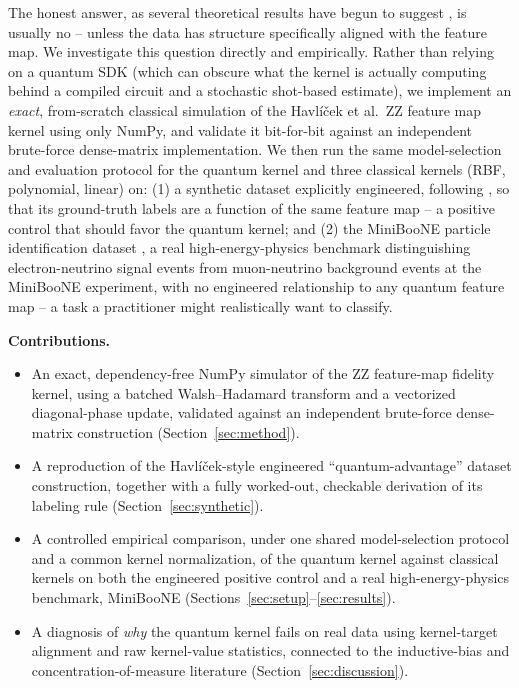 \documentclass{article}
\begin{document}
The honest answer, as several theoretical results have begun to suggest
\citep{kubler2021inductive, huang2021power, thanasilp2024exponential}, is
usually no -- unless the data has structure specifically aligned with the
feature map. We investigate this question directly and empirically. Rather
than relying on a quantum SDK (which can obscure what the kernel is actually
computing behind a compiled circuit and a stochastic shot-based estimate), we
implement an \emph{exact}, from-scratch classical simulation of the
Havl{\'i}\v{c}ek et al.\ ZZ feature map kernel using only NumPy, and validate
it bit-for-bit against an independent brute-force dense-matrix
implementation. We then run the same model-selection and evaluation protocol
for the quantum kernel and three classical kernels (RBF, polynomial, linear)
on: (1) a synthetic dataset explicitly engineered, following
\citet{havlicek2019supervised}, so that its ground-truth labels are a
function of the same feature map -- a positive control that should favor the
quantum kernel; and (2) the MiniBooNE particle identification dataset
\citep{roe2010miniboone}, a real high-energy-physics benchmark distinguishing
electron-neutrino signal events from muon-neutrino background events at the
MiniBooNE experiment, with no engineered relationship to any quantum feature
map -- a task a practitioner might realistically want to classify.

\textbf{Contributions.}
\begin{itemize}
  \item An exact, dependency-free NumPy simulator of the ZZ feature-map
  fidelity kernel, using a batched Walsh--Hadamard transform and a vectorized
  diagonal-phase update, validated against an independent brute-force
  dense-matrix construction (Section~\ref{sec:method}).
  \item A reproduction of the Havl{\'i}\v{c}ek-style engineered
  ``quantum-advantage'' dataset construction, together with a fully
  worked-out, checkable derivation of its labeling rule
  (Section~\ref{sec:synthetic}).
  \item A controlled empirical comparison, under one shared model-selection
  protocol and a common kernel normalization, of the quantum kernel against
  classical kernels on both the engineered positive control and a real
  high-energy-physics benchmark, MiniBooNE
  (Sections~\ref{sec:setup}--\ref{sec:results}).
  \item A diagnosis of \emph{why} the quantum kernel fails on real data
  using kernel-target alignment \citep{cristianini2001kernel} and raw
  kernel-value statistics, connected to the inductive-bias and
  concentration-of-measure literature (Section~\ref{sec:discussion}).
\end{itemize}
\end{document}
